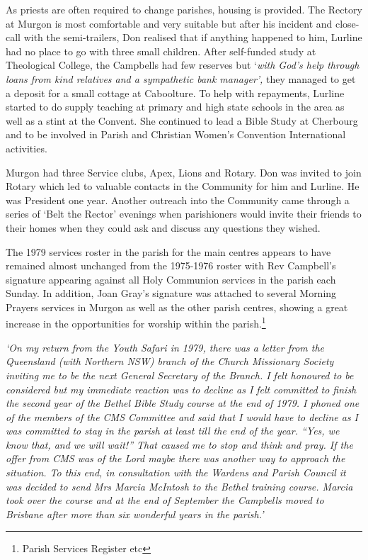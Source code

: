 As priests are often required to change parishes, housing is provided. The Rectory at Murgon is most comfortable and very suitable but after his incident and close-call with the semi-trailers, Don realised that if anything happened to him, Lurline had no place to go with three small children. After self-funded study at Theological College, the Campbells had few reserves but `\emph{with God's help through loans from kind relatives and a sympathetic bank manager',} they managed to get a deposit for a small cottage at Caboolture. To help with repayments, Lurline started to do supply teaching at primary and high state schools in the area as well as a stint at the Convent. She continued to lead a Bible Study at Cherbourg and to be involved in Parish and Christian Women's Convention International activities.



Murgon had three Service clubs, Apex, Lions and Rotary. Don was invited to join Rotary which led to valuable contacts in the Community for him and Lurline. He was President one year. Another outreach into the Community came through a series of `Belt the Rector' evenings when parishioners would invite their friends to their homes when they could ask and discuss any questions they wished.



The 1979 services roster in the parish for the main centres appears to have remained almost unchanged from the 1975-1976 roster with Rev Campbell's signature appearing against all Holy Communion services in the parish each Sunday. In addition, Joan Gray's signature was attached to several Morning Prayers services in Murgon as well as the other parish centres, showing a great increase in the opportunities for worship within the parish.\footnote{Parish Services Register etc}


\emph{`On my return from the Youth Safari in 1979, there was a letter from the Queensland (with Northern NSW) branch of the Church Missionary Society inviting me to be the next General Secretary of the Branch. I felt honoured to be considered but my immediate reaction was to decline as I felt committed to finish the second year of the Bethel Bible Study course at the end of 1979. I phoned one of the members of the CMS Committee and said that I would have to decline as I was committed to stay in the parish at least till the end of the year. ``Yes, we know that, and we will wait!'' That caused me to stop and think and pray. If the offer from CMS was of the Lord maybe there was another way to approach the situation. To this end, in consultation with the Wardens and Parish Council it was decided to send Mrs Marcia McIntosh to the Bethel training course. Marcia took over the course and at the end of September the Campbells moved to Brisbane after more than six wonderful years in the parish.'}



